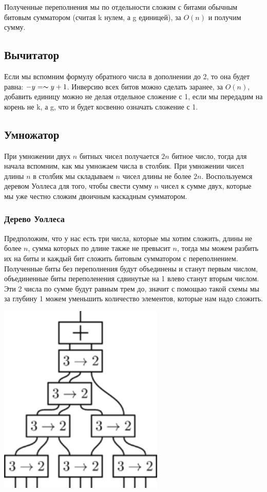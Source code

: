 \documentclass{article}
\begin{document}
Полученные переполнения мы по отдельности сложим с битами обычным битовым сумматором (считая k нулем, а g единицей), за $O(n)$ и получим сумму.
\subsection{Вычитатор}
Если мы вспомним формулу обратного числа в дополнении до 2, то она будет равна: $-y=\thicksim y+1$. Инверсию всех битов можно сделать заранее, за $O(n)$, добавить единицу можно не делая отдельное сложение с 1, если мы передадим на корень не k, а g, что и будет косвенно означать сложение с 1.

\subsection{Умножатор}
При умножении двух $n$ битных чисел получается $2n$ битное число, тогда для начала вспомним, как мы умножаем числа в столбик. При умножении чисел длины $n$ в столбик мы складываем $n$ чисел длины не более $2n$. Воспользуемся деревом Уоллеса для того, чтобы свести сумму $n$ чисел к сумме двух, которые мы уже честно сложим двоичным каскадным сумматором.
\subsubsection{Дерево Уоллеса}
Предположим, что у нас есть три числа, которые мы хотим сложить, длины не более $n$, сумма которых по длине также не превысит $n$, тогда мы можем разбить их на биты и каждый бит сложить битовым сумматором с переполнением. Полученные биты без переполнения будут объединены и станут первым числом, объединенные биты переполенения сдвинутые на 1 влево станут вторым числом. Эти 2 числа по сумме будут равным трем до, значит с помощью такой схемы мы за глубину 1 можем уменьшить количество элементов, которые нам надо сложить. 

\begin{center}
    \includegraphics[height=9.1cm]{wallace.png}
  \end{center}
\end{document}
